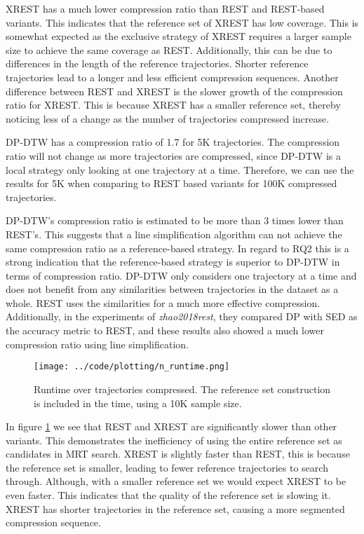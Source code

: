 XREST has a much lower compression ratio than REST and REST-based variants. This indicates that the reference set of XREST has low coverage. This is somewhat expected as the exclusive strategy of XREST requires a larger sample size to achieve the same coverage as REST. Additionally, this can be due to differences in the length of the reference trajectories. Shorter reference trajectories lead to a longer and less efficient compression sequences. Another difference between REST and XREST is the slower growth of the compression ratio for XREST. This is because XREST has a smaller reference set, thereby noticing less of a change as the number of trajectories compressed increase.

DP-DTW has a compression ratio of 1.7 for 5K trajectories. The compression ratio will not change as more trajectories are compressed, since DP-DTW is a local strategy only looking at one trajectory at a time. Therefore, we can use the results for 5K when comparing to REST based variants for 100K compressed trajectories.

DP-DTW's compression ratio is estimated to be more than 3 times lower than REST's. This suggests that a line simplification algorithm can not achieve the same compression ratio as a reference-based strategy. In regard to RQ2 this is a strong indication that the reference-based strategy is superior to DP-DTW in terms of compression ratio. DP-DTW only considers one trajectory at a time and does not benefit from any similarities between trajectories in the dataset as a whole. REST uses the similarities for a much more effective compression. Additionally, in the experiments of \textit{zhao2018rest}, they compared DP with SED as the accuracy metric to REST, and these results also showed a much lower compression ratio using line simplification.

\begin{figure}[h]
    \begin{minipage}{0.99\linewidth}
        \centering
        \texttt{[image: ../code/plotting/n\_runtime.png]}
        \caption{Runtime over trajectories compressed. The reference set construction is included in the time, using a 10K sample size.}
        \label{fig:n_runtime}
    \end{minipage}
\end{figure}

In figure \ref{fig:n_runtime} we see that REST and XREST are significantly slower than other variants. This demonstrates the inefficiency of using the entire reference set as candidates in MRT search. XREST is slightly faster than REST, this is because the reference set is smaller, leading to fewer reference trajectories to search through. Although, with a smaller reference set we would expect XREST to be even faster. This indicates that the quality of the reference set is slowing it. XREST has shorter trajectories in the reference set, causing a more segmented compression sequence.

